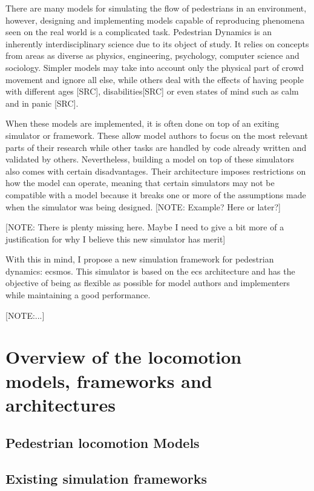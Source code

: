\documentclass[twoside, 11pt]{article}
\begin{document}
There are many models for simulating the flow of pedestrians in an environment, however, designing and implementing models capable of reproducing phenomena seen on the real world is a complicated task. Pedestrian Dynamics is an inherently interdisciplinary science due to its object of study. It relies on concepts from areas as diverse as physics, engineering, psychology, computer science and sociology. Simpler models may take into account only the physical part of crowd movement and ignore all else, while others deal with the effects of having people with different ages [SRC], disabilities[SRC] or even states of mind such as calm and in panic [SRC].

When these models are implemented, it is often done on top of an exiting simulator or framework. These allow model authors to focus on the most relevant parts of their research while other tasks are handled by code already written and validated by others. Nevertheless, building a model on top of these simulators also comes with certain disadvantages. Their architecture imposes restrictions on how the model can operate, meaning that certain simulators may not be compatible with a model because it breaks one or more of the assumptions made when the simulator was being designed. [NOTE: Example? Here or later?]

[NOTE: There is plenty missing here. Maybe I need to give a bit more of a justification for why I believe this new simulator has merit]

With this in mind, I propose a new simulation framework for pedestrian dynamics: \gls{ecsmos}. This simulator is based on the \gls{ecs} architecture and has the objective of being as flexible as possible for model authors and implementers while maintaining a good performance.

[NOTE:...]

\section{Overview of the locomotion models, frameworks and architectures} \label{overview}

\subsection{Pedestrian locomotion Models}

\subsection{Existing simulation frameworks}
\end{document}
